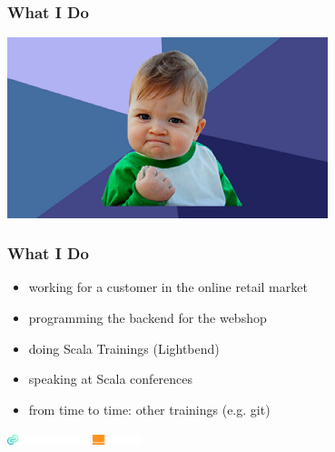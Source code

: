 \documentclass{beamer}
\begin{document}
\begin{frame}
  \frametitle{What I Do}
  \begin{center}
    \includegraphics[width=0.7\textwidth]{pics/success.jpg}
  \end{center}
\end{frame}

\begin{frame}
  \frametitle{What I Do}
  \begin{itemize}
  \item working for a customer in the online retail market
  \item programming the backend for the webshop
  \item doing Scala Trainings (Lightbend)
  \item speaking at Scala conferences
  \item from time to time: other trainings (e.g. git)
  \end{itemize}
  \vfill{}
  \includegraphics[height=3mm]{pics/codecentric-logo.png}
  \hfill{}
  \includegraphics[height=3mm]{pics/lightbend}
\end{frame}
\end{document}
